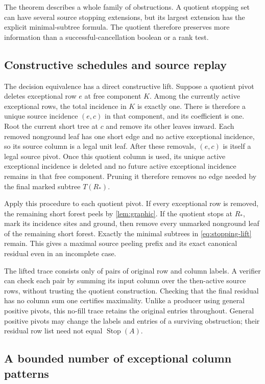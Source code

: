 The theorem describes a whole family of obstructions. A quotient stopping
set can have several source stopping extensions, but its largest extension
has the explicit minimal-subtree formula. The quotient therefore preserves
more information than a successful-cancellation boolean or a rank test.

\subsection{Constructive schedules and source replay}

The decision equivalence has a direct constructive lift. Suppose a
quotient pivot deletes exceptional row $e$ at free component $K$. Among
the currently active exceptional rows, the total incidence in $K$ is
exactly one. There is therefore a unique source incidence $(e,c)$ in
that component, and its coefficient is one. Root the current short tree
at $c$ and remove its other leaves inward. Each removed nonground leaf
has one short edge and no active exceptional incidence, so its source
column is a legal unit leaf. After these removals, $(e,c)$ is itself a
legal source pivot.
Once this quotient column is used, its unique active exceptional incidence
is deleted and no future active exceptional incidence remains in that
free component. Pruning it therefore removes no edge needed by the final
marked subtree $T(R_*)$.

Apply this procedure to each quotient pivot. If every exceptional row is
removed, the remaining short forest peels by \cref{lem:graphic}. If the
quotient stops at $R_*$, mark its incidence sites and ground, then remove
every unmarked nonground leaf of the remaining short forest. Exactly the
minimal subtrees in \eqref{eq:stopping-lift} remain. This gives a maximal
source peeling prefix and its exact canonical residual even in an
incomplete case.

The lifted trace consists only of pairs of original row and column
labels. A verifier can check each pair by summing its input column over
the then-active source rows, without trusting the quotient construction.
Checking that the final residual has no column sum one certifies
maximality. Unlike a producer using general positive pivots, this
no-fill trace retains the original entries throughout. General positive
pivots may change the labels and entries of a surviving obstruction;
their residual row list need not equal $\operatorname{Stop}(A)$.

\subsection{A bounded number of exceptional column patterns}

